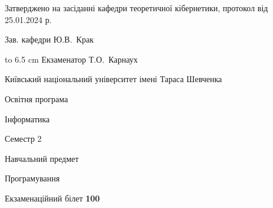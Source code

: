 \documentclass[12pt, ukrainian]{article}
\begin{document}
{\smallskip\smallskip \begin {scriptsize} Затверджено на засіданні кафедри теоретичної кібернетики, протокол   від   25.01.2024 р.\par\smallskip\smallskip\smallskip\smallskip
{\parbox {6.5 cm} {Зав. кафедри \dotfill Ю.В.~Крак}}\hspace {0.7cm} {\hbox to 6.5 cm { Екзаменатор \dotfill Т.О.~Карнаух}} \end{scriptsize}}
\newpage
{{\begin {scriptsize}\par
{ \center  Київський національний університет імені Тараса Шевченка \par}
{\parbox {5 cm}{Освітня програма \hfill}{\parbox {7 cm}{Інформатика\hfill}}\parbox {6 cm}{\hfill Семестр 2}}\par
{\parbox {5 cm} {Навчальний предмет \hfill}\parbox {7 cm}{Програмування \hfill}\parbox {6cm}{\hfill}\par}\vspace{-15pt} \end{scriptsize}}{\center Екзаменаційний білет \No \textbf { 100 }\par}}
\end{document}
